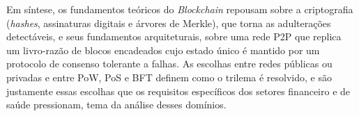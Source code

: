 Em síntese, os fundamentos teóricos do \textit{Blockchain} repousam sobre a criptografia (\textit{hashes}, assinaturas digitais e árvores de Merkle), que torna as adulterações detectáveis, e seus fundamentos arquiteturais, sobre uma rede P2P que replica um livro-razão de blocos encadeados cujo estado único é mantido por um protocolo de consenso tolerante a falhas. As escolhas entre redes públicas ou privadas e entre PoW, PoS e BFT definem como o trilema é resolvido, e são justamente essas escolhas que os requisitos específicos dos setores financeiro e de saúde pressionam, tema da análise desses domínios.
